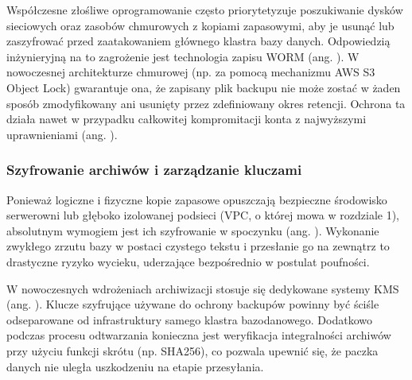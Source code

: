 \documentclass[letterpaper,10pt,polish]{sphinxmanual}
\begin{document}
\sphinxAtStartPar
Współczesne złośliwe oprogramowanie często priorytetyzuje poszukiwanie dysków sieciowych oraz zasobów chmurowych z kopiami zapasowymi, aby je usunąć lub zaszyfrować przed zaatakowaniem głównego klastra bazy danych. Odpowiedzią inżynieryjną na to zagrożenie jest technologia zapisu WORM (ang. ). W nowoczesnej architekturze chmurowej (np. za pomocą mechanizmu AWS S3 Object Lock) gwarantuje ona, że zapisany plik backupu nie może zostać w żaden sposób zmodyfikowany ani usunięty przez zdefiniowany okres retencji. Ochrona ta działa nawet w przypadku całkowitej kompromitacji konta z najwyższymi uprawnieniami (ang. ).


\subsubsection{Szyfrowanie archiwów i zarządzanie kluczami}
\label{\detokenize{rozdzia_u0142_2/rozdzia_u0142_27/rozdzial_6:szyfrowanie-archiwow-i-zarzadzanie-kluczami}}
\sphinxAtStartPar
Ponieważ logiczne i fizyczne kopie zapasowe opuszczają bezpieczne środowisko serwerowni lub głęboko izolowanej podsieci (VPC, o której mowa w rozdziale 1), absolutnym wymogiem jest ich szyfrowanie w spoczynku (ang. ). Wykonanie zwykłego zrzutu bazy w postaci czystego tekstu i przesłanie go na zewnątrz to drastyczne ryzyko wycieku, uderzające bezpośrednio w postulat poufności.

\sphinxAtStartPar
W nowoczesnych wdrożeniach archiwizacji stosuje się dedykowane systemy KMS (ang. ). Klucze szyfrujące używane do ochrony backupów powinny być ściśle odseparowane od infrastruktury samego klastra bazodanowego. Dodatkowo podczas procesu odtwarzania konieczna jest weryfikacja integralności archiwów przy użyciu funkcji skrótu (np. SHA\sphinxhyphen{}256), co pozwala upewnić się, że paczka danych nie uległa uszkodzeniu na etapie przesyłania.
\end{document}
